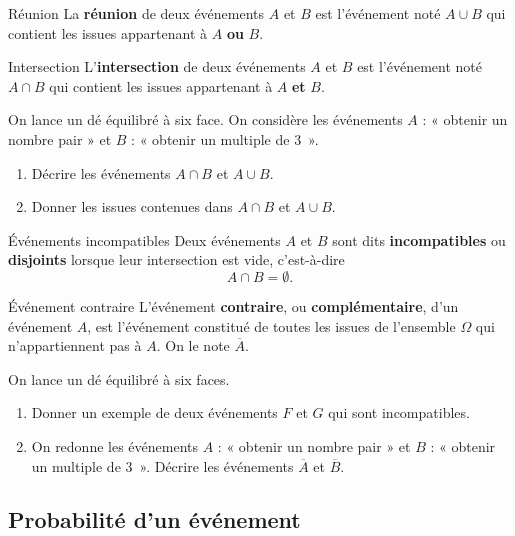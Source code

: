 \documentclass[11pt]{article}
\begin{document}
\begin{defi}{Réunion}
  La \textbf{réunion} de deux événements $A$ et $B$ est l'événement noté $A\cup
  B$ qui contient les issues appartenant à $A$ \textbf{ou} $B$.
\end{defi}

\begin{defi}{Intersection}
  L'\textbf{intersection} de deux événements $A$ et $B$ est l'événement noté
  $A\cap B$ qui contient les issues appartenant à $A$ \textbf{et} $B$.
\end{defi}

\begin{app}
  On lance un dé équilibré à six face. On considère les événements $A$ : «
  obtenir un nombre pair » et $B$ : « obtenir un multiple de $3$~».
  \begin{enumerate}
    \item Décrire les événements $A\cap B$ et $A\cup B$.
    \item Donner les issues contenues dans $A\cap B$ et $A\cup B$.
  \end{enumerate}
\end{app}

\begin{defi}{Événements incompatibles}
  Deux événements $A$ et $B$ sont dits \textbf{incompatibles} ou
  \textbf{disjoints} lorsque leur intersection est vide, c'est-à-dire
  \[
    A\cap B = \emptyset.
  \]
\end{defi}

\begin{defi}{Événement contraire}
  L'événement \textbf{contraire}, ou \textbf{complémentaire}, d'un événement
  $A$, est l'événement constitué de toutes les issues de l'ensemble $\Omega$ qui
  n'appartiennent pas à $A$. On le note $\overline A$.
\end{defi}

\begin{app}
  On lance un dé équilibré à six faces.
  \begin{enumerate}
    \item Donner un exemple de deux événements $F$ et $G$ qui sont
      incompatibles.
    \item On redonne les événements $A$ : « obtenir un nombre pair » et $B$ : «
      obtenir un multiple de $3$~». Décrire les événements $\overline A$ et
      $\overline B$.
  \end{enumerate}
\end{app}

\subsection{Probabilité d'un événement}
\end{document}
